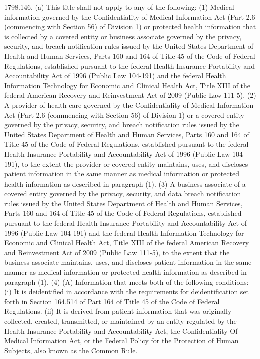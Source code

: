 1798.146.  (a) This title shall not apply to any of the following:
(1) Medical information governed by the Confidentiality of Medical Information Act (Part 2.6 (commencing with Section 56) of Division 1) or protected health information that is collected by a covered entity or business associate governed by the privacy, security, and breach notification rules issued by the United States Department of Health and Human Services, Parts 160 and 164 of Title 45 of the Code of Federal Regulations, established pursuant to the federal Health Insurance Portability and Accountability Act of 1996 (Public Law 104-191) and the federal Health Information Technology for Economic and Clinical Health Act, Title XIII of the federal American Recovery and Reinvestment Act of 2009 (Public Law 111-5).
(2) A provider of health care governed by the Confidentiality of Medical Information Act (Part 2.6 (commencing with Section 56) of Division 1) or a covered entity governed by the privacy, security, and breach notification rules issued by the United States Department of Health and Human Services, Parts 160 and 164 of Title 45 of the Code of Federal Regulations, established pursuant to the federal Health Insurance Portability and Accountability Act of 1996 (Public Law 104-191), to the extent the provider or covered entity maintains, uses, and discloses patient information in the same manner as medical information or protected health information as described in paragraph (1).
(3) A business associate of a covered entity governed by the privacy, security, and data breach notification rules issued by the United States Department of Health and Human Services, Parts 160 and 164 of Title 45 of the Code of Federal Regulations, established pursuant to the federal Health Insurance Portability and Accountability Act of 1996 (Public Law 104-191) and the federal Health Information Technology for Economic and Clinical Health Act, Title XIII of the federal American Recovery and Reinvestment Act of 2009 (Public Law 111-5), to the extent that the business associate maintains, uses, and discloses patient information in the same manner as medical information or protected health information as described in paragraph (1).
(4) (A) Information that meets both of the following conditions:
(i) It is deidentified in accordance with the requirements for deidentification set forth in Section 164.514 of Part 164 of Title 45 of the Code of Federal Regulations.
(ii) It is derived from patient information that was originally collected, created, transmitted, or maintained by an entity regulated by the Health Insurance Portability and Accountability Act, the Confidentiality Of Medical Information Act, or the Federal Policy for the Protection of Human Subjects, also known as the Common Rule.
